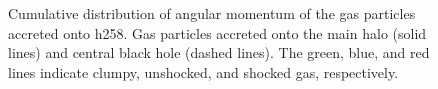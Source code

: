 \documentclass[manuscript]{aastex}
\begin{document}
\begin{figure}
\centerline{}
\caption[]{ Cumulative distribution of angular momentum of the gas particles accreted onto h258.  Gas particles accreted onto the main halo (solid lines) and central black hole (dashed lines). The green, blue, and red lines indicate clumpy, unshocked, and shocked gas, respectively.}
\label{hrh258angmom} 
\end{figure}
\end{document}
